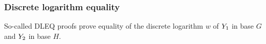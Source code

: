 \documentclass[11pt]{article}
\begin{document}


\subsubsection{Discrete logarithm equality}
So-called DLEQ proofs prove equality of the discrete logarithm $w$ of $Y_1$ in base $G$ and $Y_2$ in base $H$.
\end{document}
